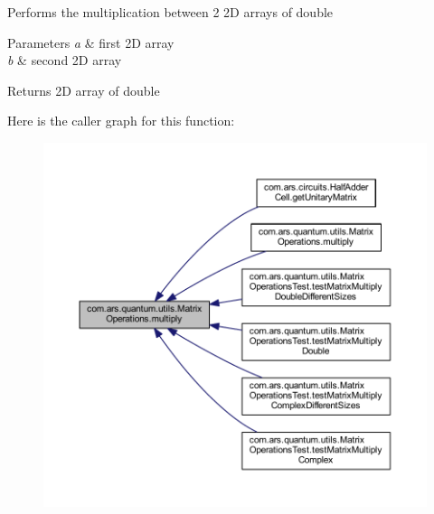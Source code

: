 Performs the multiplication between 2 2D arrays of double


\begin{DoxyParams}{Parameters}
{\em a} & first 2D array \\
\hline
{\em b} & second 2D array \\
\hline
\end{DoxyParams}
\begin{DoxyReturn}{Returns}
2D array of double 
\end{DoxyReturn}
Here is the caller graph for this function\+:
\nopagebreak
\begin{figure}[H]
\begin{center}
\leavevmode
\includegraphics[width=350pt]{classcom_1_1ars_1_1quantum_1_1utils_1_1_matrix_operations_a0739b9c18cbe7d85ae01056f4b7e08d9_icgraph}
\end{center}
\end{figure}
\hypertarget{classcom_1_1ars_1_1quantum_1_1utils_1_1_matrix_operations_ae7c98406e2a3c1d35d78538d82bd637d}{}\label{classcom_1_1ars_1_1quantum_1_1utils_1_1_matrix_operations_ae7c98406e2a3c1d35d78538d82bd637d} 
